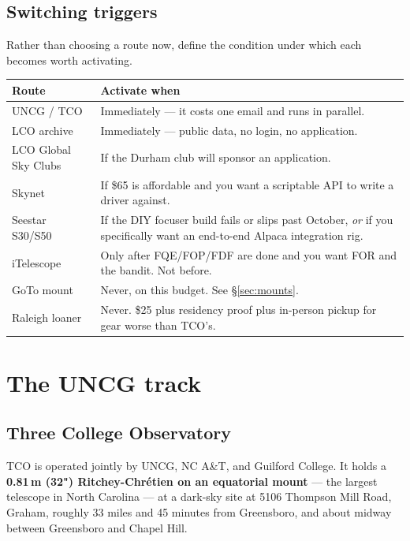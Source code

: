 \documentclass[11pt]{article}
\begin{document}
\subsection{Switching triggers}

Rather than choosing a route now, define the condition under which each becomes
worth activating.

\begin{center}
\small
\begin{tabular}{@{}p{}p{}@{}}
\toprule
\textbf{Route} & \textbf{Activate when} \\
\midrule
UNCG / TCO & Immediately --- it costs one email and runs in parallel. \\
LCO archive & Immediately --- public data, no login, no application. \\
LCO Global Sky Clubs & If the Durham club will sponsor an application. \\
Skynet & If \$65 is affordable and you want a scriptable API to write a driver against. \\
Seestar S30/S50 & If the DIY focuser build fails or slips past October, \emph{or} if you specifically want an end-to-end Alpaca integration rig. \\
iTelescope & Only after FQE/FOP/FDF are done and you want FOR and the bandit. Not before. \\
GoTo mount & Never, on this budget. See \S\ref{sec:mounts}. \\
Raleigh loaner & Never. \$25 plus residency proof plus in-person pickup for gear worse than TCO's. \\
\bottomrule
\end{tabular}
\end{center}

\section{The UNCG track}
\label{sec:uncg}

\subsection{Three College Observatory}

TCO is operated jointly by UNCG, NC A\&T, and Guilford College. It holds a
\textbf{0.81\,m (32") Ritchey-Chr\'etien on an equatorial mount} --- the largest
telescope in North Carolina --- at a dark-sky site at 5106 Thompson Mill Road,
Graham, roughly 33 miles and 45 minutes from Greensboro, and about midway
between Greensboro and Chapel Hill.
\end{document}
